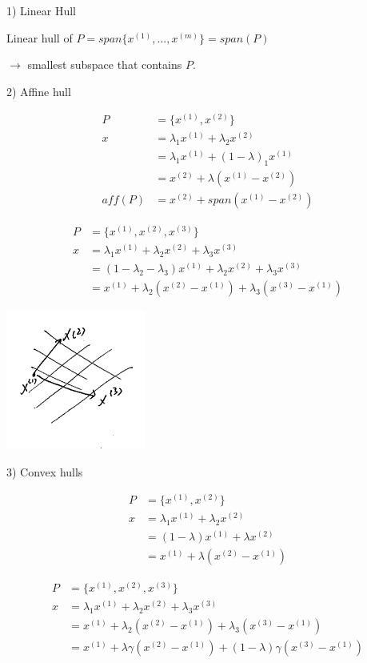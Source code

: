 1) Linear Hull

Linear hull of $P = span\{x^{(1)},...,x^{(m)} \} =span(P)$

$\rightarrow$ smallest subspace that contains $P$.

2) Affine hull

\begin{align*}
P &= \{x^{(1)}, x^{(2)} \}\\
x &= \lambda_1x^{(1)} + \lambda_2x^{(2)}\\
&= \lambda_1x^{(1)} + (1-\lambda)_1x^{(1)}\\
&= x^{(2)} + \lambda(x^{(1)} - x^{(2)})\\
aff(P) &= x^{(2)} + span(x^{(1)} - x^{(2)})
\end{align*}

\begin{align*}
P &= \{x^{(1)}, x^{(2)}, x^{(3)} \}\\
x &= \lambda_1x^{(1)} + \lambda_2x^{(2)} + \lambda_3x^{(3)}\\
&= (1 - \lambda_2 - \lambda_3)x^{(1)} + \lambda_2x^{(2)} + \lambda_3x^{(3)}\\
&= x^{(1)} + \lambda_2(x^{(2)} - x^{(1)}) + \lambda_3(x^{(3)} - x^{(1)})
\end{align*}

\begin{marginfigure}
	\centering
	\includegraphics[width=1.8in,height=1.8in]{figures/ch08/figure1023_1.png}
\end{marginfigure}

3) Convex hulls

\begin{align*}
P &= \{x^{(1)},  x^{(2)}\}\\
x &= \lambda_1x^{(1)} + \lambda_2x^{(2)}\\
&= (1-\lambda)x^{(1)} + \lambda x^{(2)}\\
&= x^{(1)} + \lambda(x^{(2)} - x^{(1)})
\end{align*}

\begin{align*}
P &= \{x^{(1)},  x^{(2)}, x^{(3)} \}\\
x &= \lambda_1x^{(1)} + \lambda_2x^{(2)} + \lambda_3x^{(3)}\\
&= x^{(1)} + \lambda_2(x^{(2)} - x^{(1)}) + \lambda_3(x^{(3)} - x^{(1)})\\
&= x^{(1)} + \lambda \gamma(x^{(2)} - x^{(1)}) + (1 - \lambda)\gamma(x^{(3)} - x^{(1)})
\end{align*}


